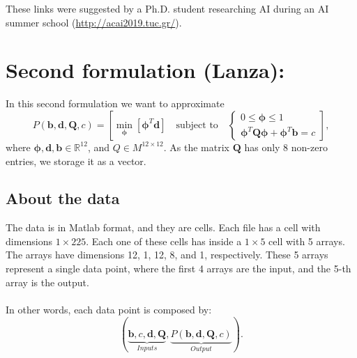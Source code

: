 \documentclass[12pt]{article}
\theoremstyle{definition}
\theoremstyle{remark}
\newcommand{\R}{\mathbb{R}}
\begin{document}
These links were suggested by a Ph.D. student researching AI during an AI summer school (\url{http://acai2019.tuc.gr/}).

\section*{Second formulation (Lanza):}

In this second formulation we want to approximate
\begin{equation}
P(\bm{b,d,Q},c)=\left[\min_{\bm{\phi}}\left[\bm{\phi}^T\bm{d}\right]\quad\text{subject to}\quad\begin{cases}
0\leq\bm{\phi}\leq1\\
\bm{\phi}^T\bm{Q}\bm{\phi}+\bm{\phi}^T\bm{b}=c
\end{cases}\right],
\label{2}
\end{equation}
where $\bm{\phi,d,b}\in\R^{12}$, and $Q\in M^{12\times12}$. As the matrix $\bm{Q}$ has only 8 non-zero entries, we storage it as a vector.

\subsection*{About the data}

The data is in Matlab format, and they are cells. Each file has a cell with dimensions $1\times225$. Each one of these cells has inside a $1\times5$ cell with 5 arrays. The arrays have dimensions 12, 1, 12, 8, and 1, respectively. These 5 arrays represent a single data point, where the first 4 arrays are the input, and the 5-th array is the output.\\
\quad\\
In other words, each data point is composed by:
\begin{equation*}
\left(\underbrace{\bm{b},c,\bm{d},\bm{Q}}_{Inputs},\underbrace{P(\bm{b,d,Q},c)}_{Output}\right).
\end{equation*}
\end{document}
